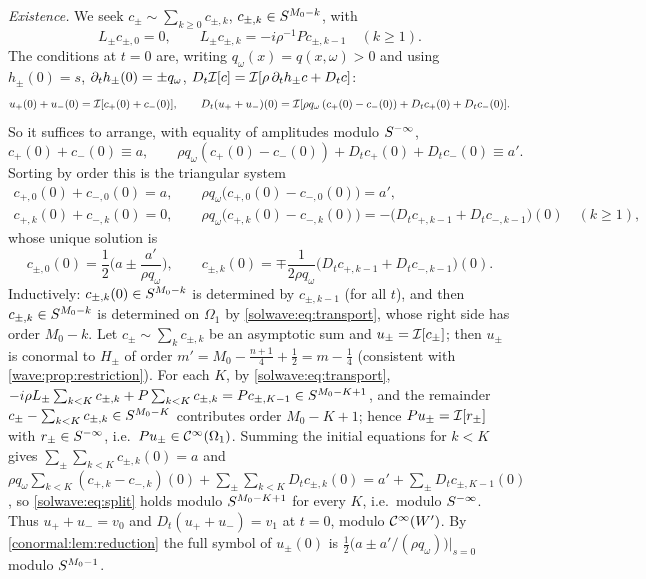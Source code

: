 \emph{Existence.} We seek $c_\pm\sim\sum_{k\ge0}c_{\pm,k}$, $c_{\pm,k}\in S^{M_0-k}$, with
\begin{equation}\label{solwave:eq:transport}
  L_\pm c_{\pm,0}=0,\qquad L_\pm c_{\pm,k}=-i\rho^{-1}Pc_{\pm,k-1}\quad(k\ge1).
\end{equation}
The conditions at $t=0$ are, writing $q_\omega(x)=q(x,\omega)>0$ and using
$h_\pm(0)=s$, $\partial_th_\pm(0)=\pm q_\omega$, $D_t\mathcal{I}[c]=\mathcal{I}[\rho\,\partial_th_\pm c+D_tc]$:
\begin{equation*}
  u_+(0)+u_-(0)=\mathcal{I}[c_+(0)+c_-(0)],\qquad
  D_t(u_++u_-)(0)=\mathcal{I}[\rho q_\omega\,(c_+(0)-c_-(0))+D_tc_+(0)+D_tc_-(0)] .
\end{equation*}
So it suffices to arrange, with equality of amplitudes modulo $S^{-\infty}$,
\begin{equation}\label{solwave:eq:split}
  c_+(0)+c_-(0)\equiv a,\qquad \rho q_\omega(c_+(0)-c_-(0))+D_tc_+(0)+D_tc_-(0)\equiv a' .
\end{equation}
Sorting by order this is the triangular system
\begin{gather*}
  c_{+,0}(0)+c_{-,0}(0)=a,\qquad \rho q_\omega\big(c_{+,0}(0)-c_{-,0}(0)\big)=a',\\
  c_{+,k}(0)+c_{-,k}(0)=0,\qquad \rho q_\omega\big(c_{+,k}(0)-c_{-,k}(0)\big)=-\big(D_tc_{+,k-1}+D_tc_{-,k-1}\big)(0)\quad(k\ge1),
\end{gather*}
whose unique solution is
\begin{equation*}
  c_{\pm,0}(0)=\frac12\Big(a\pm\frac{a'}{\rho q_\omega}\Big),\qquad
  c_{\pm,k}(0)=\mp\frac1{2\rho q_\omega}\big(D_tc_{+,k-1}+D_tc_{-,k-1}\big)(0).
\end{equation*}
Inductively: $c_{\pm,k}(0)\in S^{M_0-k}$ is determined by $c_{\pm,k-1}$ (for all $t$), and then
$c_{\pm,k}\in S^{M_0-k}$ is determined on $\Omega_1$ by \eqref{solwave:eq:transport}, whose right
side has order $M_0-k$. Let $c_\pm\sim\sum_kc_{\pm,k}$ be an asymptotic sum and $u_\pm=\mathcal{I}[c_\pm]$;
then $u_\pm$ is conormal to $H_\pm$ of order $m'=M_0-\frac{n+1}4+\frac12=m-\frac14$ (consistent
with \cref{wave:prop:restriction}). For each $K$, by \eqref{solwave:eq:transport},
$-i\rho L_\pm\sum_{k<K}c_{\pm,k}+P\sum_{k<K}c_{\pm,k}=Pc_{\pm,K-1}\in S^{M_0-K+1}$, and the
remainder $c_\pm-\sum_{k<K}c_{\pm,k}\in S^{M_0-K}$ contributes order $M_0-K+1$; hence
$Pu_\pm=\mathcal{I}[r_\pm]$ with $r_\pm\in S^{-\infty}$, i.e.\ $Pu_\pm\in\mathcal{C}^\infty(\Omega_1)$. Summing the
initial equations for $k<K$ gives $\sum_\pm\sum_{k<K}c_{\pm,k}(0)=a$ and
$\rho q_\omega\sum_{k<K}(c_{+,k}-c_{-,k})(0)+\sum_\pm\sum_{k<K}D_tc_{\pm,k}(0)=a'+\sum_\pm D_tc_{\pm,K-1}(0)$,
so \eqref{solwave:eq:split} holds modulo $S^{M_0-K+1}$ for every $K$, i.e.\ modulo $S^{-\infty}$.
Thus $u_++u_-=v_0$ and $D_t(u_++u_-)=v_1$ at $t=0$, modulo $\mathcal{C}^\infty(W')$. By
\cref{conormal:lem:reduction} the full symbol of $u_\pm(0)$ is
$\frac12\big(a\pm a'/(\rho q_\omega)\big)|_{s=0}$ modulo $S^{M_0-1}$.

